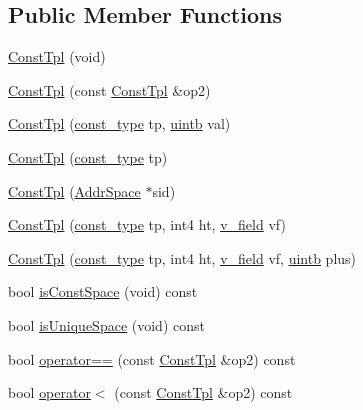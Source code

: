 \subsection*{Public Member Functions}
\begin{DoxyCompactItemize}
\item 
\mbox{\hyperlink{class_const_tpl_ab6740169364924eba7cf0901c6a12380}{Const\+Tpl}} (void)
\item 
\mbox{\hyperlink{class_const_tpl_ae3a5265248a081e1aa47c16b39dfcaf7}{Const\+Tpl}} (const \mbox{\hyperlink{class_const_tpl}{Const\+Tpl}} \&op2)
\item 
\mbox{\hyperlink{class_const_tpl_a5cd6bb0244ddd590c39911370fcb51a2}{Const\+Tpl}} (\mbox{\hyperlink{class_const_tpl_af7f677ee5ef2e5af1becb0109793396b}{const\+\_\+type}} tp, \mbox{\hyperlink{types_8h_a2db313c5d32a12b01d26ac9b3bca178f}{uintb}} val)
\item 
\mbox{\hyperlink{class_const_tpl_a19de20824475f051abdef1ac4edb67fd}{Const\+Tpl}} (\mbox{\hyperlink{class_const_tpl_af7f677ee5ef2e5af1becb0109793396b}{const\+\_\+type}} tp)
\item 
\mbox{\hyperlink{class_const_tpl_aa5ca3edd704efb40fc06dea3e4325fda}{Const\+Tpl}} (\mbox{\hyperlink{class_addr_space}{Addr\+Space}} $\ast$sid)
\item 
\mbox{\hyperlink{class_const_tpl_ad962a583381d61306fe8d007bbca1c55}{Const\+Tpl}} (\mbox{\hyperlink{class_const_tpl_af7f677ee5ef2e5af1becb0109793396b}{const\+\_\+type}} tp, int4 ht, \mbox{\hyperlink{class_const_tpl_a4aa1b485e0cac884006d1aa35b3b0c57}{v\+\_\+field}} vf)
\item 
\mbox{\hyperlink{class_const_tpl_a142aaf2a01641780bfc0911cf64f0faf}{Const\+Tpl}} (\mbox{\hyperlink{class_const_tpl_af7f677ee5ef2e5af1becb0109793396b}{const\+\_\+type}} tp, int4 ht, \mbox{\hyperlink{class_const_tpl_a4aa1b485e0cac884006d1aa35b3b0c57}{v\+\_\+field}} vf, \mbox{\hyperlink{types_8h_a2db313c5d32a12b01d26ac9b3bca178f}{uintb}} plus)
\item 
bool \mbox{\hyperlink{class_const_tpl_a9b303a814a4e17013e37d4dcb70b4a79}{is\+Const\+Space}} (void) const
\item 
bool \mbox{\hyperlink{class_const_tpl_a9626ee452f63e079a22ab5662e92cd6d}{is\+Unique\+Space}} (void) const
\item 
bool \mbox{\hyperlink{class_const_tpl_a6476d76ec2c6e32dc8dc47f96b45ac8f}{operator==}} (const \mbox{\hyperlink{class_const_tpl}{Const\+Tpl}} \&op2) const
\item 
bool \mbox{\hyperlink{class_const_tpl_a6b340db27f3077b7e618e7b0e23e98ce}{operator$<$}} (const \mbox{\hyperlink{class_const_tpl}{Const\+Tpl}} \&op2) const

\end{DoxyCompactItemize}
